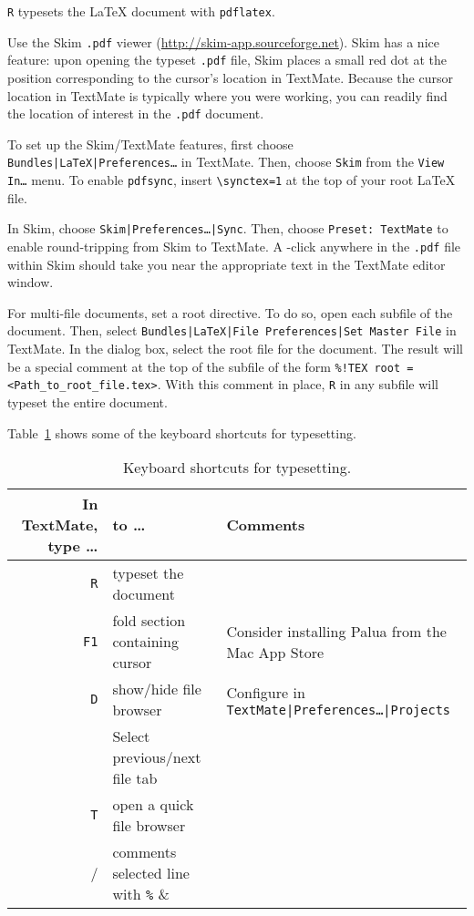 \documentclass[10pt]{article}
\begin{document}
\cmdkey\texttt{R} typesets the \LaTeX{} document with \texttt{pdflatex}. 

Use the Skim \texttt{.pdf} viewer (\url{http://skim-app.sourceforge.net}).
Skim has a nice feature: upon opening the typeset \texttt{.pdf} file,
Skim places a small red dot at the position corresponding to the cursor's 
location in TextMate. 
Because the cursor location in TextMate is typically where you were working,
you can readily find the location of interest in the \texttt{.pdf} document.

To set up the Skim/TextMate features, 
first choose \texttt{Bundles|LaTeX|Preferences\dots} in TextMate.
Then, choose \texttt{Skim} from the \texttt{View In\dots} menu.
To enable \texttt{pdfsync}, insert \verb!\synctex=1! 
at the top of your root \LaTeX{} file.

In Skim, choose \texttt{Skim|Preferences\dots|Sync}. 
Then, choose \texttt{Preset:~TextMate} to enable round-tripping from Skim to TextMate. 
A \cmdkey\shiftkey-click anywhere in the \texttt{.pdf} file within Skim 
should take you near the appropriate text in the TextMate editor window.

For multi-file documents, set a root directive. 
To do so, open each subfile of the document. 
Then, select \texttt{Bundles|LaTeX|File Preferences|Set Master File} in TextMate.
In the dialog box, select the root file for the document. 
The result will be a special comment at the top of the subfile of the form
\verb&%!TEX root = <Path_to_root_file.tex>&.
With this comment in place, \cmdkey\texttt{R} in any subfile will typeset the entire document.

Table~\ref{tab:typesetting_keyboard_shortcuts} shows some of the keyboard shortcuts for typesetting.

\begin{table}
\centering
\caption{Keyboard shortcuts for typesetting.}
\begin{tabular}{r|l|l}
	In TextMate, type \dots & to \dots      & Comments                  \\
	\hline
	\cmdkey\texttt{R}           & typeset the document            &                           \\
	\texttt{F1}                 & fold section containing cursor  & Consider installing Palua from the Mac App Store \\
	\ctlkey\optkey\cmdkey\texttt{D}&show/hide file browser        & Configure in \texttt{TextMate|Preferences\dots|Projects} \\
	\cmdkey\shiftkey [, \cmdkey\shiftkey ] & Select previous/next file tab  &          \\
	\cmdkey\texttt{T}           & open a quick file browser                 &          \\
	\cmdkey/                    & comments selected line with \verb!%!      &          \\
\end{tabular}
\label{tab:typesetting_keyboard_shortcuts}
\end{table}
\end{document}
